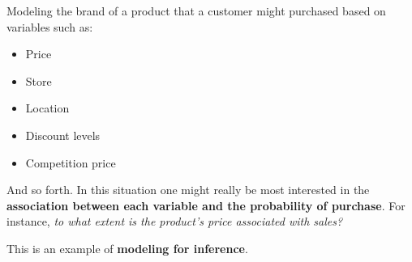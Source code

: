 \documentclass[a4paper]{article}
\begin{document}
    \begin{examplebox}
        Modeling the brand of a product that a customer might purchased based on variables such as:
            \begin{itemize}
                \item Price
                \item Store
                \item Location
                \item Discount levels
                \item Competition price
            \end{itemize}
        And so forth. In this situation one might really be most interested in the \textbf{association between each variable and the probability of purchase}. For instance, \emph{to what extent is the product's price associated with sales?}

        This is an example of \textbf{modeling for inference}.
    \end{examplebox}

    \newpage
\end{document}
